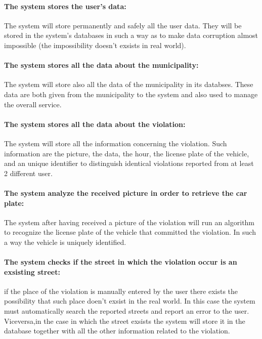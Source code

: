 \documentclass[titlepage]{article}
\begin{document}
\paragraph{The system stores the user's data:}
The system will store permanently and safely all the user data. They will be stored in the system's databases in such a way as to make data corruption almost impossible (the impossibility doesn't exsists in real world).
\paragraph{The system stores all the data about the 					municipality:}
The system will store also all the data of the municipality in its databses. These data are both given from the municipality to the system and also used to manage the overall service.
\paragraph{The system stores all the data about the violation: }
The system will store all the information concerning the violation. Such information are the picture, the data, the hour, the license plate of the vehicle, and an unique identifier to distinguish identical violations reported from at least 2 different user.
\paragraph{The system analyze the received picture in order to 	retrieve the car plate: }
The system after having received a picture of the violation will run an algorithm to recognize the license plate of the vehicle that committed the violation. In such a way the vehicle is uniquely identified.
\paragraph{The system checks if the street in which the 				violation occur is an exsisting street: }
if the place of the violation is manually entered by the user there exists the possibility that such place doen't exsist in the real world. In this case the system must automatically search the reported streets and report an error to the user. Viceversa,in the case in which the street exsists the system will store it in the database together with all the other information related to the violation.
\end{document}

